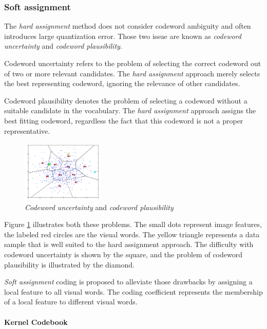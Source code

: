 \subsubsection{Soft assignment}

The \emph{hard assignment} method does not consider codeword ambiguity and often introduces large quantization error. Those two issue are known as \emph{codeword uncertainty} and \emph{codeword plausibility}. 

Codeword uncertainty refers to the problem of selecting the correct codeword out of two or more relevant candidates. The \emph{hard assignment} approach merely selects the best representing codeword, ignoring the relevance of other candidates. 

Codeword plausibility denotes the problem of selecting a codeword without a suitable candidate in the vocabulary. The \emph{hard assignment} approach assigns the best fitting codeword, regardless the fact that this codeword is not a proper representative. 

\begin{figure}[h]
\begin{center}
\includegraphics[width=0.35\textwidth]{images/soft-assignment.jpg}
\end{center}
  \caption{\emph{Codeword uncertainty} and \emph{codeword plausibility}}
\label{fig:softAssignment}
\end{figure}

Figure \ref{fig:softAssignment} illustrates both these problems. The small dots represent image features, the labeled red circles are the visual words. The yellow triangle represents a data sample that is well suited to the hard assignment approach. The difficulty with codeword uncertainty is shown by the square, and the problem of codeword plausibility is illustrated by the diamond.

\emph{Soft assignment} coding is proposed to alleviate those drawbacks by assigning a local feature to all visual words. The coding coefficient represents the membership of a local feature to different visual words.

\paragraph{Kernel Codebook}

